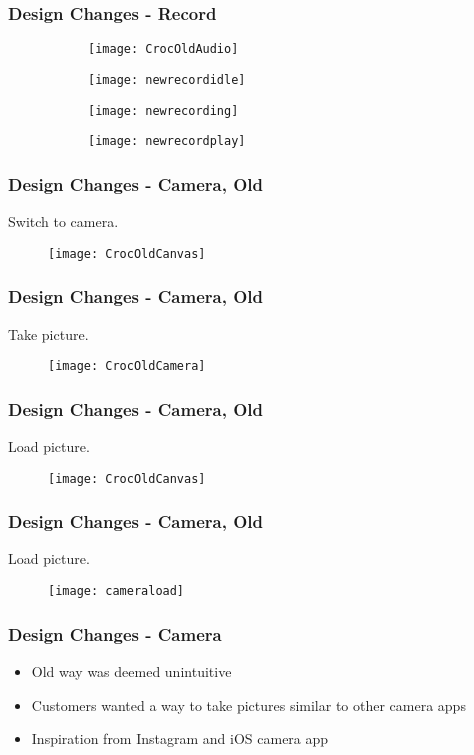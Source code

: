 \begin{frame}
	\frametitle{Design Changes - Record}
	\begin{figure}
	        \centering
	        \begin{subfigure}[b]{0.24\textwidth}
	                \texttt{[image: CrocOldAudio]}
	        \end{subfigure}%
	        \begin{subfigure}[b]{0.24\textwidth}
	                \texttt{[image: newrecordidle]}
	        \end{subfigure}
	        \begin{subfigure}[b]{0.24\textwidth}
	                \texttt{[image: newrecording]}
	        \end{subfigure}
 	        \begin{subfigure}[b]{0.24\textwidth}
 	                \texttt{[image: newrecordplay]}
 	        \end{subfigure}
	\end{figure}
\end{frame}

\begin{frame}
	\frametitle{Design Changes - Camera, Old}
	Switch to camera.
		\begin{figure}
		\centering
			\texttt{[image: CrocOldCanvas]}
		\end{figure}
\end{frame}

\begin{frame}
	\frametitle{Design Changes - Camera, Old}
	Take picture.
		\begin{figure}
		\centering
			\texttt{[image: CrocOldCamera]}
		\end{figure}
\end{frame}

\begin{frame}
	\frametitle{Design Changes - Camera, Old}
	Load picture.
		\begin{figure}
		\centering
			\texttt{[image: CrocOldCanvas]}
		\end{figure}
\end{frame}

\begin{frame}
	\frametitle{Design Changes - Camera, Old}
	Load picture.
		\begin{figure}
		\centering
			\texttt{[image: cameraload]}
		\end{figure}
\end{frame}
\begin{frame}
	\frametitle{Design Changes - Camera}
	\begin{itemize}
		\item Old way was deemed unintuitive
		\item Customers wanted a way to take pictures similar to other camera apps
		\item Inspiration from Instagram and iOS camera app
	\end{itemize}
\end{frame}

